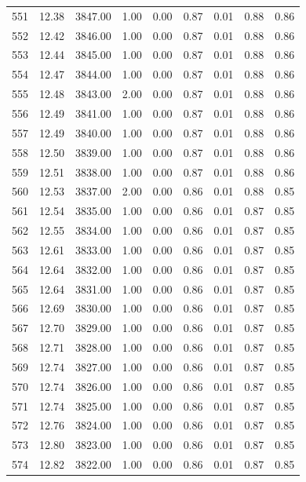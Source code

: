 \documentclass{article}\usepackage[]{graphicx}\usepackage[]{color}
\begin{document}
\begin{longtable}{rrrrrrrrr}
  551 & 12.38 & 3847.00 & 1.00 & 0.00 & 0.87 & 0.01 & 0.88 & 0.86 \\ 
  552 & 12.42 & 3846.00 & 1.00 & 0.00 & 0.87 & 0.01 & 0.88 & 0.86 \\ 
  553 & 12.44 & 3845.00 & 1.00 & 0.00 & 0.87 & 0.01 & 0.88 & 0.86 \\ 
  554 & 12.47 & 3844.00 & 1.00 & 0.00 & 0.87 & 0.01 & 0.88 & 0.86 \\ 
  555 & 12.48 & 3843.00 & 2.00 & 0.00 & 0.87 & 0.01 & 0.88 & 0.86 \\ 
  556 & 12.49 & 3841.00 & 1.00 & 0.00 & 0.87 & 0.01 & 0.88 & 0.86 \\ 
  557 & 12.49 & 3840.00 & 1.00 & 0.00 & 0.87 & 0.01 & 0.88 & 0.86 \\ 
  558 & 12.50 & 3839.00 & 1.00 & 0.00 & 0.87 & 0.01 & 0.88 & 0.86 \\ 
  559 & 12.51 & 3838.00 & 1.00 & 0.00 & 0.87 & 0.01 & 0.88 & 0.86 \\ 
  560 & 12.53 & 3837.00 & 2.00 & 0.00 & 0.86 & 0.01 & 0.88 & 0.85 \\ 
  561 & 12.54 & 3835.00 & 1.00 & 0.00 & 0.86 & 0.01 & 0.87 & 0.85 \\ 
  562 & 12.55 & 3834.00 & 1.00 & 0.00 & 0.86 & 0.01 & 0.87 & 0.85 \\ 
  563 & 12.61 & 3833.00 & 1.00 & 0.00 & 0.86 & 0.01 & 0.87 & 0.85 \\ 
  564 & 12.64 & 3832.00 & 1.00 & 0.00 & 0.86 & 0.01 & 0.87 & 0.85 \\ 
  565 & 12.64 & 3831.00 & 1.00 & 0.00 & 0.86 & 0.01 & 0.87 & 0.85 \\ 
  566 & 12.69 & 3830.00 & 1.00 & 0.00 & 0.86 & 0.01 & 0.87 & 0.85 \\ 
  567 & 12.70 & 3829.00 & 1.00 & 0.00 & 0.86 & 0.01 & 0.87 & 0.85 \\ 
  568 & 12.71 & 3828.00 & 1.00 & 0.00 & 0.86 & 0.01 & 0.87 & 0.85 \\ 
  569 & 12.74 & 3827.00 & 1.00 & 0.00 & 0.86 & 0.01 & 0.87 & 0.85 \\ 
  570 & 12.74 & 3826.00 & 1.00 & 0.00 & 0.86 & 0.01 & 0.87 & 0.85 \\ 
  571 & 12.74 & 3825.00 & 1.00 & 0.00 & 0.86 & 0.01 & 0.87 & 0.85 \\ 
  572 & 12.76 & 3824.00 & 1.00 & 0.00 & 0.86 & 0.01 & 0.87 & 0.85 \\ 
  573 & 12.80 & 3823.00 & 1.00 & 0.00 & 0.86 & 0.01 & 0.87 & 0.85 \\ 
  574 & 12.82 & 3822.00 & 1.00 & 0.00 & 0.86 & 0.01 & 0.87 & 0.85 \\ 

\end{longtable}
\end{document}
